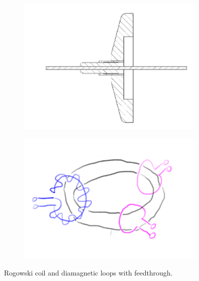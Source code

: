 \begin{figure}[H]
    \centering
    \begin{subfigure}{0.49\textwidth}
        \centering
        \includegraphics[width=1\textwidth]{sections/imges/ports/coaxial_feedthough.png}
        \label{fig:coaxial_cable_feedthrough}
    \end{subfigure}
    \hfill
    \begin{subfigure}{0.49\textwidth}
        \centering
        \includegraphics[width=1\textwidth]{sections/imges/ports/rogowski_coil_diamagnetx_loop.png}
        \label{fig:rogowski_coil_diamagnetic_loops}
    \end{subfigure}
    \caption{Rogowski coil and diamagnetic loops with feedthrough.}
\end{figure}




